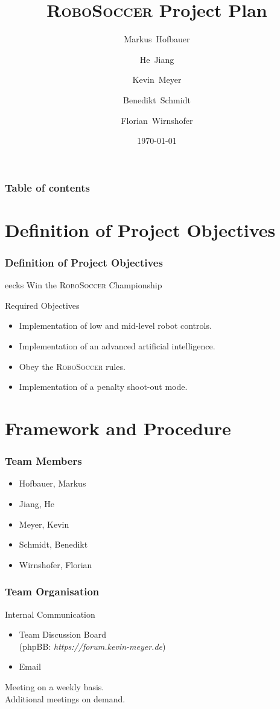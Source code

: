 \documentclass[hyperref={pdfpagelabels=false}]{beamer}
\title{\textsc{RoboSoccer} Project Plan}
\author[Hofbauer, Jiang, Meyer, Schmidt, Wirnshofer]{
  Markus~Hofbauer \and
  He~Jiang \and
  Kevin~Meyer \and
  Benedikt~Schmidt \and
  Florian~Wirnshofer
}
\institute
{
	Technische Universit\"at M\"unchen, Germany
}
\date{\today}
\begin{document}
\begin{frame}
\titlepage
\end{frame} 

%
\begin{frame}
\frametitle{Table of contents}
\tableofcontents
\end{frame} 

\section{Definition of Project Objectives} 
\begin{frame}
	\frametitle{Definition of Project Objectives} 
	
	\begin{beamercolorbox}[shadow=true, rounded=true]{eecks}
		\centering		
		\Large{Win the \textsc{RoboSoccer} Championship}
	\end{beamercolorbox}
	\vspace{1cm}
	\begin{block}{Required Objectives}
		\begin{itemize}
			\item Implementation of low and mid-level robot controls.
			\item Implementation of an advanced artificial intelligence.
			\item Obey the \textsc{RoboSoccer} rules.
			\item Implementation of a penalty shoot-out mode.
		\end{itemize}
	\end{block}
\end{frame}


\section{Framework and Procedure} 
\begin{frame}
	\frametitle{Team Members}
	\begin{itemize}
		\item Hofbauer, Markus
  		\item Jiang, He 
 		\item Meyer, Kevin
  		\item Schmidt, Benedikt
  		\item Wirnshofer, Florian
	\end{itemize}
\end{frame}

\begin{frame}
	\frametitle{Team Organisation}
	Internal Communication\\
	\begin{itemize}
		\item  Team Discussion Board \\
		(phpBB: \textit{https://forum.kevin-meyer.de})
  		\item Email
	\end{itemize}
	\vspace{0.75cm}	
	Meeting on a weekly basis.\\
	\vspace{0.75cm}
	Additional meetings on demand.
\end{frame}
\end{document}
